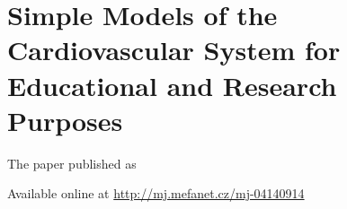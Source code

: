 \chapter{Simple Models of the Cardiovascular System for Educational and Research Purposes}\label{app:simplemodelsd}
The paper \cite{Kulhanek2014mefanet} published as
 

Available online at \url{http://mj.mefanet.cz/mj-04140914}


